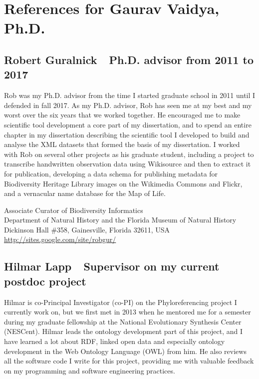 \documentclass[12pt,letter]{article}
\begin{document}

% 

{\selectfont
    \section*{\large \centering References for Gaurav Vaidya, Ph.D.}
}

\subsection*{Robert Guralnick~\smallbullet~Ph.D. advisor from 2011 to 2017}

Rob was my Ph.D. advisor from the time I started graduate school in 2011 until I defended in fall 2017. As my Ph.D. advisor, Rob has seen me at my best and my worst over the six years that we worked together. He encouraged me to make scientific tool development a core part of my dissertation, and to spend an entire chapter in my dissertation describing the scientific tool I developed to build and analyse the XML datasets that formed the basis of my dissertation. I worked with Rob on several other projects as his graduate student, including a project to transcribe handwritten observation data using Wikisource and then to extract it for publication, developing a data schema for publishing metadata for Biodiversity Heritage Library images on the Wikimedia Commons and Flickr, and a vernacular name database for the Map of Life.

\begin{adjustwidth}{1em}{}
Associate Curator of Biodiversity Informatics \\
Department of Natural History and the Florida Museum of Natural History \\
Dickinson Hall \#358, Gainesville, Florida 32611, USA \\
\url{http://sites.google.com/site/robgur/} \\
\end{adjustwidth}

\vspace{0.5em}

\subsection*{Hilmar Lapp~\smallbullet~Supervisor on my current postdoc project}

Hilmar is co-Principal Investigator (co-PI) on the Phyloreferencing project I currently work on, but we first met in 2013 when he mentored me for a semester during my graduate fellowship at the National Evolutionary Synthesis Center (NESCent). Hilmar leads the ontology development part of this project, and I have learned a lot about RDF, linked open data and especially ontology development in the Web Ontology Language (OWL) from him. He also reviews all the software code I write for this project, providing me with valuable feedback on my programming and software engineering practices.
\end{document}
